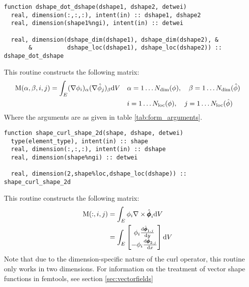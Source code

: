\documentclass[a4paper, 11pt]{book}
\begin{document}

\begin{lstlisting}
function dshape_dot_dshape(dshape1, dshape2, detwei)
  real, dimension(:,:,:), intent(in) :: dshape1, dshape2
  real, dimension(shape1%ngi), intent(in) :: detwei

  real, dimension(dshape_dim(dshape1), dshape_dim(dshape2), &
       &          dshape_loc(dshape1), dshape_loc(dshape2)) :: dshape_dot_dshape
\end{lstlisting}

This routine constructs the following matrix:
\begin{equation}
  \begin{split}
  \mathrm{M}(\alpha,\beta,i,j)=\int_E (\nabla\phi_{i})_\alpha(\nabla\hat{\phi}_{j})_\beta\mathrm{d} V
  &\quad \alpha=1\ldots N_\mathrm{dim}(\phi),\quad \beta=1\ldots N_\mathrm{dim}(\hat{\phi})\\
  &\quad i=1\ldots N_\mathrm{loc}(\phi),\quad j=1\ldots N_\mathrm{loc}(\hat{\phi})
  \end{split}
\end{equation}
Where the arguments are as given in table \ref{tab:form_arguments}.


\begin{lstlisting}
function shape_curl_shape_2d(shape, dshape, detwei)
  type(element_type), intent(in) :: shape
  real, dimension(:,:,:), intent(in) :: dshape
  real, dimension(shape%ngi) :: detwei

  real, dimension(2,shape%loc,dshape_loc(dshape)) :: shape_curl_shape_2d
\end{lstlisting}

This routine constructs the following matrix:
\begin{equation}
  \begin{split}
    \mathrm{M}(:,i,j)&=\int_E \phi_i \nabla\times\hat{\pmb{\phi}}_i\mathrm{d} V\\
    &=\int_E
    \begin{bmatrix}
       \phi_i \frac{\mathrm{d}\hat{\pmb{\phi}}_{1,j}}{\mathrm{d} y}\\
      -\phi_i \frac{\mathrm{d}\hat{\pmb{\phi}}_{2,j}}{\mathrm{d} x}
    \end{bmatrix}\mathrm{d} V
  \end{split}
\end{equation}
Note that due to the dimension-specific nature of the curl operator, this
routine only works in two dimensions. For information on the treatment of
vector shape functions in femtools, see section \ref{sec:vectorfields}
\end{document}
